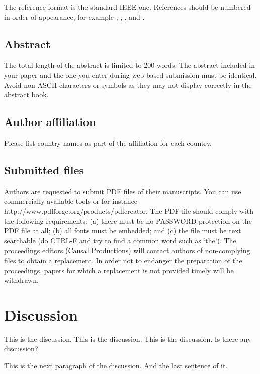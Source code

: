 \documentclass[a4paper]{article}
\begin{document}
      The reference format is the standard IEEE one.
      References should be numbered in order of appearance, for example \cite{Davis80-COP}, \cite{Rabiner89-ATO}, \cite[pp.\ 417--422]{Hastie09-TEO}, and \cite{YourName16-XXX}.

  
    \subsection{Abstract}

      The total length of the abstract is limited to 200 words. 
      The abstract included in your paper and the one you enter during web-based submission must be identical. 
      Avoid non-ASCII characters or symbols as they may not display correctly in the abstract book.

  
    \subsection{Author affiliation}
  
      Please list country names as part of the affiliation for each country.

  
    \subsection{Submitted files}
  
      Authors are requested to submit PDF files of their manuscripts. 
      You can use commercially available tools or for instance http://www.pdfforge.org/products/pdfcreator.
      The PDF file should comply with the following requirements: 
      (a) there must be no PASSWORD protection on the PDF file at all; 
      (b) all fonts must be embedded; and
      (c) the file must be text searchable (do CTRL-F and try to find a common word such as `the').
      The proceedings editors (Causal Productions) will contact authors of non-complying files to obtain a replacement. 
      In order not to endanger the preparation of the proceedings, papers for which a replacement is not provided timely will be withdrawn.


  \section{Discussion}
  
    This is the discussion. 
    This is the discussion. 
    This is the discussion.
    Is there any discussion?

    This is the next paragraph of the discussion. 
    And the last sentence of it.
\end{document}
